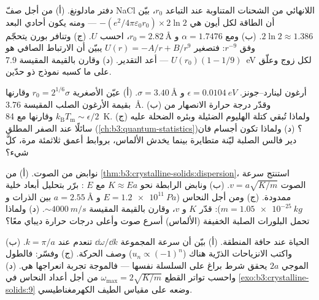 \begin{exercise}[$\star\star$]\label{exo:b3:crystalline-solids:7}
دفتر مادلونغ. (أ) من أجل صفّ NaCl اللانهائي من الشحنات
المتناوبة عند التباعد $r_0$، بيّن أن الطاقة لكل أيون هي
$-(e^2/4\pi\varepsilon_0r_0)\times2\ln2$ --- ومنه يكون
 أحادي البعد $2\ln2 \approx 1.386$. (ب)
ومع $\alpha = 1.7476$ و $r_0 = \qty{2.82}{\angstrom}$، احسب
$U$. (ج) وتنافر بورن يتحجّم وفق $r^{-9}$: فتصغير
$U(r) = -A/r + B/r^9$ يبيّن أن الارتباط الصافي هو $U(r_0)(1 - 1/9)$
--- أعد التقدير. (د) وقارن بالقيمة المقيسة
\qty{7.9}{eV} لكل زوج وعلّق على ما كسبه نموذج ذو حدّين.
\end{exercise}

\begin{exercise}[$\star\star$]\label{exo:b3:crystalline-solids:8}
أرغون لينارد--جونز. $\epsilon = \qty{0.0104}{eV}$ و $\sigma =
\qty{3.40}{\angstrom}$. (أ) عيّن الأصغرية $r_0 = 2^{1/6}
\sigma$ وقارنها بقيمة الأرغون الصلب المقيسة
\qty{3.76}{\angstrom}. (ب) وقدّر درجة حرارة الانصهار من
$k_{\text{B}}T_{\text{m}} \sim \epsilon/2$ وقارنها مع
\qty{84}{K}. (ج) ولماذا تُبقي كتلة الهليوم الضئيلة وبئره الضحلة
عليه سائلًا عند الصفر المطلق (\cref{ch:b3:quantum-statistics})؟ (د)
ولماذا تكون أجسام فان دير فالس الصلبة ليّنة متطايرة بينما يخدش الألماس،
بروابط أعمق ثلاثمئة مرة، كلَّ شيء؟
\end{exercise}

\begin{exercise}[$\star\star$]\label{exo:b3:crystalline-solids:9}
نوابض من الصوت. (أ) من
\cref{thm:b3:crystalline-solids:dispersion}، استنتج سرعة
الصوت $v = a\sqrt{K/m}$. (ب) ونابض الرابطة نحو $K \approx
Ea$ مع $E$ : برّر بتحليل أبعاد
خلية ممدودة. (ج) ومن أجل النحاس ($E = \qty{1.2e11}{Pa}$ و
$a = \qty{2.55}{\angstrom}$ بين الذرات و $m =
\qty{1.05e-25}{kg}$): قدّر $K$ و $v$، وقارن بالقيمة
المقيسة $\sim\qty{4000}{m/s}$. (د) ولماذا تحمل البلورات الصلبة الخفيفة
(الألماس) أسرع صوت وأعلى درجات حرارة
ديباي معًا؟
\end{exercise}

\begin{exercise}[$\star\star\star$]\label{exo:b3:crystalline-solids:10}
الحياة عند حافة المنطقة. (أ) بيّن أن سرعة المجموعة
$\dd\omega/\dd k$ تنعدم عند $k = \pi/a$. (ب) واكتب الانزياحات
الذرّية هناك ($u_n \propto (-1)^n$) وصف
الحركة. (ج) وفسّر: فالطول الموجي $2a$ يحقق شرط
براغ على السلسلة نفسها --- فالموجة تجربة انعراجها
هي. (د) واحسب تواتر القطع
$\omega_{\text{max}} = 2\sqrt{K/m}$ من أجل أعداد النحاس في
\cref{exo:b3:crystalline-solids:9} وضعه على
مقياس الطيف الكهرمغناطيسي.
\end{exercise}

